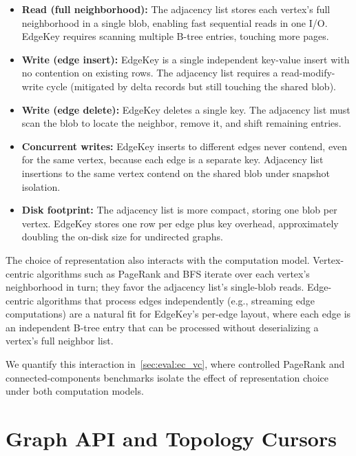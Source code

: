 \begin{itemize}
  \item \textbf{Read (full neighborhood):} The adjacency list stores each vertex's full neighborhood in a single blob, enabling fast sequential reads in one I/O. EdgeKey requires scanning multiple B-tree entries, touching more pages.

  \item \textbf{Write (edge insert):} EdgeKey is a single independent key-value insert with no contention on existing rows. The adjacency list requires a read-modify-write cycle (mitigated by  delta records but still touching the shared blob).

  \item \textbf{Write (edge delete):} EdgeKey deletes a single key. The adjacency list must scan the blob to locate the neighbor, remove it, and shift remaining entries.

  \item \textbf{Concurrent writes:} EdgeKey inserts to different edges never contend, even for the same vertex, because each edge is a separate key. Adjacency list insertions to the same vertex contend on the shared blob under snapshot isolation.

  \item \textbf{Disk footprint:} The adjacency list is more compact, storing one blob per vertex. EdgeKey stores one row per edge plus key overhead, approximately doubling the on-disk size for undirected graphs.
\end{itemize}

The choice of representation also interacts with the computation model.
Vertex-centric algorithms such as PageRank and BFS iterate over each vertex's neighborhood in turn; they favor the adjacency list's single-blob reads.
Edge-centric algorithms that process edges independently (e.g., streaming edge computations) are a natural fit for EdgeKey's per-edge layout, where each edge is an independent B-tree entry that can be processed without deserializing a vertex's full neighbor list.

We quantify this interaction in~\autoref{sec:eval:ec_vc}, where controlled PageRank and connected-components benchmarks isolate the effect of representation choice under both computation models.

\section{Graph API and Topology Cursors}
\label{arch:api}

